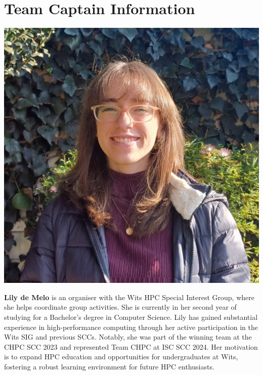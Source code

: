 \documentclass[10pt, onecolumn]{IEEEtran}
\begin{document}
\section{Team Captain Information}
\noindent
\begin{minipage}{0.2\textwidth}
  \includegraphics[width=\textwidth]{lily_photo.jpg}
\end{minipage}
\hspace{0.02\textwidth} %
\begin{minipage}{0.65\textwidth}
  \textbf{Lily de Melo} is an organiser with the Wits HPC Special Interest Group, where she helps coordinate group activities. She is currently in her second year of studying for a Bachelor's degree in Computer Science. Lily has gained substantial experience in high-performance computing through her active participation in the Wits SIG and previous SCCs. Notably, she was part of the winning team at the CHPC SCC 2023 and represented Team CHPC at ISC SCC 2024. Her motivation is to expand HPC education and opportunities for undergraduates at Wits, fostering a robust learning environment for future HPC enthusiasts.
\end{minipage}
\\\\
\end{document}
